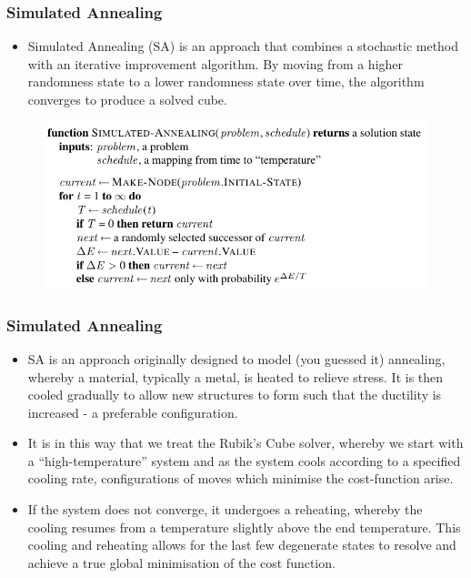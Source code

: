\documentclass{beamer}
\begin{document}
\begin{frame}
\frametitle{Simulated Annealing}
\begin{itemize}
    \item Simulated Annealing (SA) is an approach that combines a stochastic method with an iterative improvement algorithm. By moving from a higher randomness state to a lower randomness state over time, the algorithm converges to produce a solved cube.
\end{itemize}

\begin{figure}[!h]
\begin{small}
\centering
\linespread{1.0}
\includegraphics[width=0.75\linewidth]{images/simulated-annealing}
\label{fig:fig12}
\end{small}
\end{figure}

\end{frame}

\begin{frame}
\frametitle{Simulated Annealing}
\begin{itemize}
    \item SA is an approach originally designed to model (you guessed it) annealing, whereby a material, typically a metal, is heated to relieve stress. It is then cooled gradually to allow new structures to form such that the ductility is increased - a preferable configuration.
    \item It is in this way that we treat the Rubik's Cube solver, whereby we start with a ``high-temperature'' system and as the system cools according to a specified cooling rate, configurations of moves which minimise the cost-function arise.
    \item If the system does not converge, it undergoes a reheating, whereby the cooling resumes from a temperature slightly above the end temperature. This cooling and reheating allows for the last few degenerate states to resolve and achieve a true global minimisation of the cost function.
\end{itemize}

\end{frame}
\end{document}
